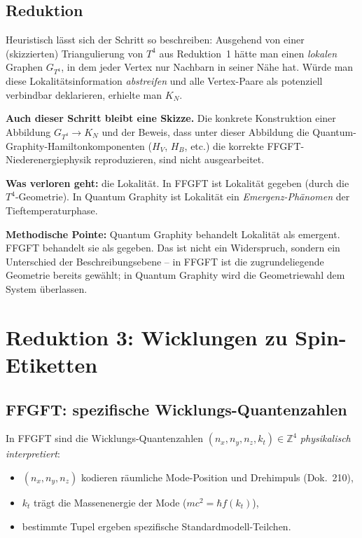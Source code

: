 \subsection{Reduktion}

Heuristisch lässt sich der Schritt so beschreiben: Ausgehend von
einer (skizzierten) Triangulierung von $T^4$ aus Reduktion~1 hätte
man einen \emph{lokalen} Graphen $G_{T^4}$, in dem jeder Vertex nur
Nachbarn in seiner Nähe hat. Würde man diese Lokalitätsinformation
\emph{abstreifen} und alle Vertex-Paare als potenziell verbindbar
deklarieren, erhielte man $K_N$.

\textbf{Auch dieser Schritt bleibt eine Skizze.} Die konkrete
Konstruktion einer Abbildung $G_{T^4} \to K_N$ und der Beweis, dass
unter dieser Abbildung die Quantum-Graphity-Hamiltonkomponenten
($H_V$, $H_B$, etc.) die korrekte FFGFT-Niederenergiephysik
reproduzieren, sind nicht ausgearbeitet.

\textbf{Was verloren geht:} die Lokalität. In FFGFT ist Lokalität
gegeben (durch die $T^4$-Geometrie). In Quantum Graphity ist
Lokalität ein \emph{Emergenz-Phänomen} der Tieftemperaturphase.

\textbf{Methodische Pointe:} Quantum Graphity behandelt Lokalität
als emergent. FFGFT behandelt sie als gegeben. Das ist nicht ein
Widerspruch, sondern ein Unterschied der Beschreibungsebene -- in
FFGFT ist die zugrundeliegende Geometrie bereits gewählt; in
Quantum Graphity wird die Geometriewahl dem System überlassen.

\section{Reduktion 3: Wicklungen zu Spin-Etiketten}

\subsection{FFGFT: spezifische Wicklungs-Quantenzahlen}

In FFGFT sind die Wicklungs-Quantenzahlen
$(n_x, n_y, n_z, k_t) \in \mathbb{Z}^4$ \emph{physikalisch
interpretiert}:
\begin{itemize}[leftmargin=2em,itemsep=2pt,topsep=2pt]
  \item $(n_x, n_y, n_z)$ kodieren räumliche Mode-Position und
        Drehimpuls (Dok.~210),
  \item $k_t$ trägt die Massenenergie der Mode
        ($m c^2 = \hbar f(k_t)$),
  \item bestimmte Tupel ergeben spezifische Standardmodell-Teilchen.
\end{itemize}

